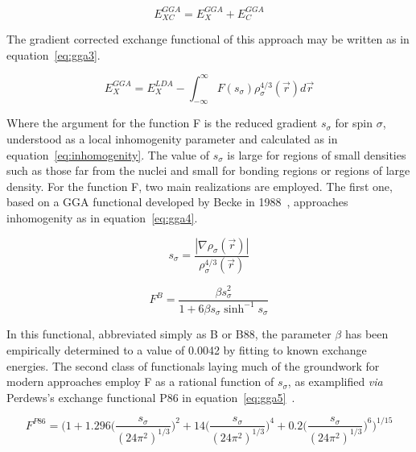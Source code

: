 \documentclass[11pt]{article}
\begin{document}
\begin{equation}
  E_{XC}^{GGA} = E_X^{GGA} + E_C^{GGA}
  \label{eq:gga1}
\end{equation}

\bigskip

\noindent The gradient corrected exchange functional of this approach may be written as in equation~\ref{eq:gga3}.

\begin{equation}
  E_X^{GGA} = E_X^{LDA} - \int_{-\infty}^{\infty} F(s_{\sigma}) \rho_{\sigma}^{4/3}(\vec{r})d\vec{r}
  \label{eq:gga3}
\end{equation}

\bigskip

\noindent Where the argument for the function F is the reduced gradient $s_{\sigma}$ for spin $\sigma$, understood as a local inhomogenity parameter and calculated as in equation~\ref{eq:inhomogenity}.
The value of $s_{\sigma}$ is large for regions of small densities such as those far from the nuclei and small for bonding regions or regions of large density.
For the function F, two main realizations are employed. The first one, based on a GGA functional developed by Becke in 1988~\cite{Becke1988}, approaches inhomogenity as in equation~\ref{eq:gga4}.

\begin{equation}
  s_{\sigma} = \frac{|\nabla\rho_{\sigma}(\vec{r})|}{\rho_{\sigma}^{4/3}(\vec{r})}
  \label{eq:inhomogenity}
\end{equation}

\begin{equation}
  F^{B} = \frac{\beta s^2_{\sigma}}{1 + 6\beta s_{\sigma} \sinh^{-1}s_{\sigma}}
  \label{eq:gga4}
\end{equation}

\bigskip

\noindent In this functional, abbreviated simply as B or B88, the parameter $\beta$ has been empirically determined to a value of 0.0042 by fitting to known exchange energies.
The second class of functionals laying much of the groundwork for modern approaches employ F as a rational function of $s_{\sigma}$, as examplified \textit{via} Perdews's exchange functional P86 in equation~\ref{eq:gga5}~\cite{Perdew1986}.

\begin{equation}
  F^{P86} = \Biggl(1+1.296\biggl(\frac{s_{\sigma}}{(24\pi^2)^{1/3}}\biggl)^2 + 14\biggl(\frac{s_{\sigma}}{(24\pi^2)^{1/3}}\biggl)^4 + 0.2\biggl(\frac{s_{\sigma}}{(24\pi^2)^{1/3}}\biggl)^6 \Biggl)^{1/15}
  \label{eq:gga5}
\end{equation}
\end{document}
